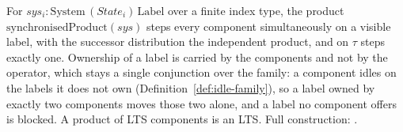 \begin{definition}
  \label{def:synchronised-product}
  \leanok
  For $sys_i : \mathrm{System}\,(State_i)\,\mathrm{Label}$ over a finite index type, the product $\mathrm{synchronisedProduct}(sys)$ steps every component simultaneously on a visible label, with the successor distribution the independent product, and on $\tau$ steps exactly one.
  Ownership of a label is carried by the components and not by the operator, which stays a single conjunction over the family: a component idles on the labels it does not own (Definition~\ref{def:idle-family}), so a label owned by exactly two components moves those two alone, and a label no component offers is blocked.
  A product of LTS components is an LTS.
  Full construction: .
\end{definition}

